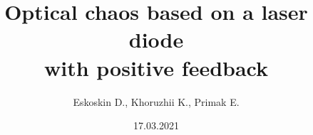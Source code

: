 \documentclass[]{beamer}
\title[Optical chaos]{Optical chaos based on a laser diode \\
with positive  feedback}
\author{
Eskoskin D., 
Khoruzhii K., Primak E.}
\institute[MIPT]
\begin{document}
\date{17.03.2021}
\maketitle






% 









% 




\end{document}
